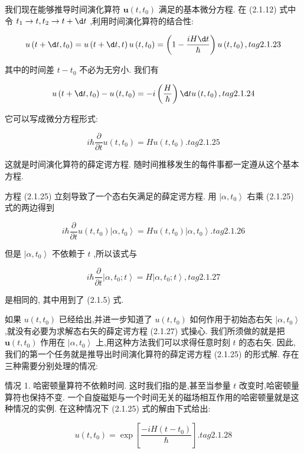 \documentclass[lang=cn,newtx,10pt,scheme=chinese,thmcnt=section]{elegantbook}
\begin{document}
我们现在能够推导时间演化算符 $\mathbf{u}\left( {t,{t}_{0}}\right)$ 满足的基本微分方程. 在 (2.1.12) 式中令 ${t}_{1} \rightarrow t,{t}_{2} \rightarrow t + {\d t}$ ,利用时间演化算符的结合性:

$$
u\left( {t + {\d t},{t}_{0}}\right) = u\left( {t + {\d t}, t}\right) u\left( {t,{t}_{0}}\right) = \left( {1 - \frac{iH\d t}{\hbar }}\right) u\left( {t,{t}_{0}}\right) , tag{2.1.23}
$$

其中的时间差 $t - {t}_{0}$ 不必为无穷小. 我们有

$$
u\left( {t + {\d t},{t}_{0}}\right) - u\left( {t,{t}_{0}}\right) = - i\left( \frac{H}{\hbar }\right) {\d t}u\left( {t,{t}_{0}}\right) , tag{2.1.24}
$$

它可以写成微分方程形式:

$$
i\hbar \frac{\partial }{\partial t}u\left( {t,{t}_{0}}\right) = {Hu}\left( {t,{t}_{0}}\right) . tag{2.1.25}
$$

这就是时间演化算符的薛定谔方程. 随时间推移发生的每件事都一定遵从这个基本方程.

方程 (2.1.25) 立刻导致了一个态右矢满足的薛定谔方程. 用 $\left| {\alpha ,{t}_{0}}\right\rangle$ 右乘 (2.1.25) 式的两边得到

$$
i\hbar \frac{\partial }{\partial t}u\left( {t,{t}_{0}}\right) \left| {\alpha ,{t}_{0}}\right\rangle = {Hu}\left( {t,{t}_{0}}\right) \left| {\alpha ,{t}_{0}}\right\rangle . tag{2.1.26}
$$

但是 $\left| {\alpha ,{t}_{0}}\right\rangle$ 不依赖于 $t$ ,所以该式与

$$
i\hbar \frac{\partial }{\partial t}\left| {\alpha ,{t}_{0};t}\right\rangle = H\left| {\alpha ,{t}_{0};t}\right\rangle , tag{2.1.27}
$$

是相同的, 其中用到了 (2.1.5) 式.

如果 $u\left( {t,{t}_{0}}\right)$ 已经给出,并进一步知道了 $u\left( {t,{t}_{0}}\right)$ 如何作用于初始态右矢 $\left| {\alpha ,{t}_{0}}\right\rangle$ ,就没有必要为求解态右矢的薛定谔方程 (2.1.27) 式操心. 我们所须做的就是把 $\mathbf{u}\left( {t,{t}_{0}}\right)$ 作用在 $\left| {\alpha ,{t}_{0}}\right\rangle$ 上,用这种方法我们可以求得任意时刻 $t$ 的态右矢. 因此,我们的第一个任务就是推导出时间演化算符的薛定谔方程 (2.1.25) 的形式解. 存在三种需要分别处理的情况:

情况 1. 哈密顿量算符不依赖时间. 这时我们指的是,甚至当参量 $t$ 改变时,哈密顿量算符也保持不变. 一个自旋磁矩与一个时间无关的磁场相互作用的哈密顿量就是这种情况的实例. 在这种情况下 (2.1.25) 式的解由下式给出:

$$
u\left( {t,{t}_{0}}\right) = \exp \left\lbrack \frac{-{iH}\left( {t - {t}_{0}}\right) }{\hbar }\right\rbrack . tag{2.1.28}
$$
\end{document}
